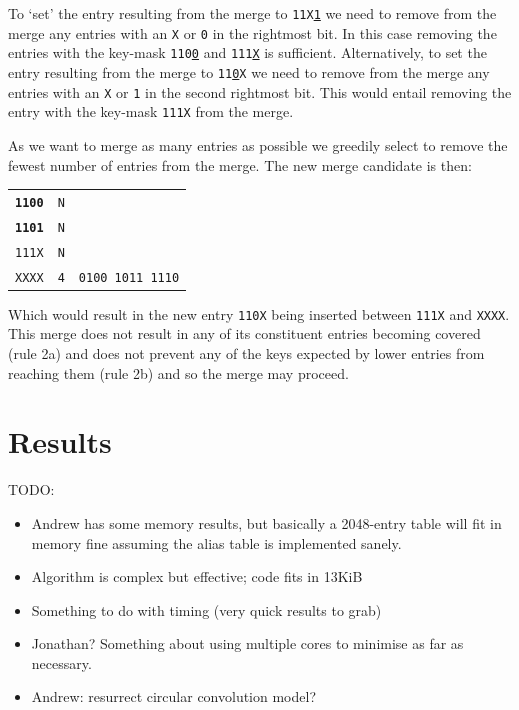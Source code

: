 \documentclass[conference]{IEEEtran}
\newcommand{\mytt}[1]{\texttt{\footnotesize#1}}
\begin{document}
  To `set' the entry resulting from the merge to \mytt{11X\underline{1}} we need to remove from the merge any entries with an \mytt{X} or \mytt{0} in the rightmost bit.
  In this case removing the entries with the key-mask \mytt{110\underline{0}} and \mytt{111\underline{X}} is sufficient.
  Alternatively, to set the entry resulting from the merge to \mytt{11\underline{0}X} we need to remove from the merge any entries with an \mytt{X} or \mytt{1} in the second rightmost bit.
  This would entail removing the entry with the key-mask \mytt{111X} from the merge.

  As we want to merge as many entries as possible we greedily select to remove the fewest number of entries from the merge.
  The new merge candidate is then:

  \begin{table}[H]
    \centering
    \begin{tabular}{c l l}
      \toprule
      \textbf{\texttt{1100}} & \texttt{N} \\
      \textbf{\texttt{1101}} & \texttt{N} \\
      \texttt{111X} & \texttt{N} \\
      \texttt{XXXX} & \texttt{4} & \texttt{0100 1011 1110} \\
      \bottomrule
    \end{tabular}
  \end{table}

  Which would result in the new entry \mytt{110X} being inserted between \mytt{111X} and \mytt{XXXX}.
  This merge does not result in any of its constituent entries becoming covered (rule 2a) and does not prevent any of the keys expected by lower entries from reaching them (rule 2b) and so the merge may proceed.

  \section{Results}

  TODO:
  \begin{itemize}
    \item Andrew has some memory results, but basically a 2048-entry table will fit in memory fine assuming the alias table is implemented sanely.
    \item Algorithm is complex but effective; code fits in 13KiB
    \item Something to do with timing (very quick results to grab)
    \item Jonathan? Something about using multiple cores to minimise as far as necessary.
    \item Andrew: resurrect circular convolution model?
  \end{itemize}
  
\end{document}
